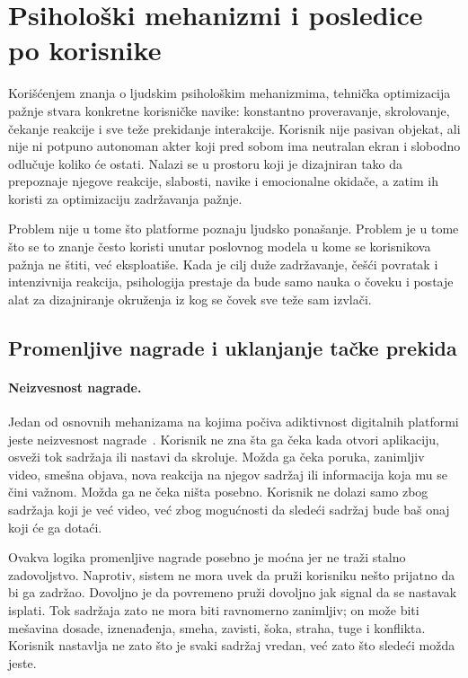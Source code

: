 \section{Psihološki mehanizmi i posledice po korisnike}

Korišćenjem znanja o ljudskim psihološkim mehanizmima, tehnička optimizacija pažnje stvara konkretne korisničke navike: konstantno proveravanje, skrolovanje, čekanje reakcije i sve teže prekidanje interakcije. Korisnik nije pasivan objekat, ali nije ni potpuno autonoman akter koji pred sobom ima neutralan ekran i slobodno odlučuje koliko će ostati. Nalazi se u prostoru koji je dizajniran tako da prepoznaje njegove reakcije, slabosti, navike i emocionalne okidače, a zatim ih koristi za optimizaciju zadržavanja pažnje.

Problem nije u tome što platforme poznaju ljudsko ponašanje. Problem je u tome što se to znanje često koristi unutar poslovnog modela u kome se korisnikova pažnja ne štiti, već eksploatiše. Kada je cilj duže zadržavanje, češći povratak i intenzivnija reakcija, psihologija prestaje da bude samo nauka o čoveku i postaje alat za dizajniranje okruženja iz kog se čovek sve teže sam izvlači.

\subsection{Promenljive nagrade i uklanjanje tačke prekida}

\paragraph{Neizvesnost nagrade.}
Jedan od osnovnih mehanizama na kojima počiva adiktivnost digitalnih platformi jeste neizvesnost nagrade~\cite{montag2019addictive}. Korisnik ne zna šta ga čeka kada otvori aplikaciju, osveži tok sadržaja ili nastavi da skroluje. Možda ga čeka poruka, zanimljiv video, smešna objava, nova reakcija na njegov sadržaj ili informacija koja mu se čini važnom. Možda ga ne čeka ništa posebno. Korisnik ne dolazi samo zbog sadržaja koji je već video, već zbog mogućnosti da sledeći sadržaj bude baš onaj koji će ga dotaći.

Ovakva logika promenljive nagrade posebno je moćna jer ne traži stalno zadovoljstvo. Naprotiv, sistem ne mora uvek da pruži korisniku nešto prijatno da bi ga zadržao. Dovoljno je da povremeno pruži dovoljno jak signal da se nastavak isplati. Tok sadržaja zato ne mora biti ravnomerno zanimljiv; on može biti mešavina dosade, iznenađenja, smeha, zavisti, šoka, straha, tuge i konflikta. Korisnik nastavlja ne zato što je svaki sadržaj vredan, već zato što sledeći možda jeste.

